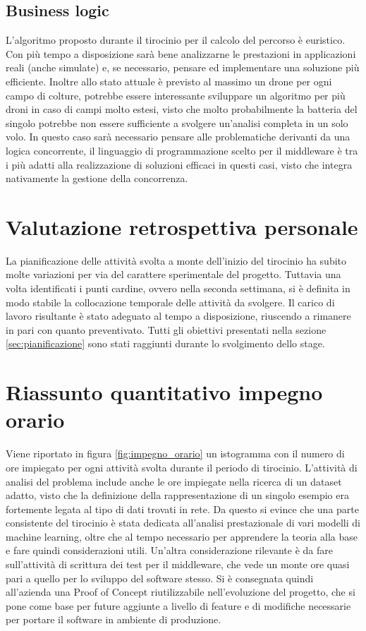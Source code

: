 \subsection{Business logic}
L'algoritmo proposto durante il tirocinio per il calcolo del percorso è euristico. Con più tempo a disposizione sarà bene analizzarne le prestazioni in applicazioni reali (anche simulate) e, se necessario, pensare ed implementare una soluzione più efficiente. Inoltre allo stato attuale è previsto al massimo un drone per ogni campo di colture, potrebbe essere interessante sviluppare un algoritmo per più droni in caso di campi molto estesi, visto che molto probabilmente la batteria del singolo potrebbe non essere sufficiente a svolgere un'analisi completa in un solo volo. In questo caso sarà necessario pensare alle problematiche derivanti da una logica concorrente, il linguaggio di programmazione scelto per il middleware è tra i più adatti alla realizzazione di soluzioni efficaci in questi casi, visto che integra nativamente la gestione della concorrenza.

\section{Valutazione retrospettiva personale}
La pianificazione delle attività svolta a monte dell'inizio del tirocinio ha subito molte variazioni per via del carattere sperimentale del progetto. Tuttavia una volta identificati i punti cardine, ovvero nella seconda settimana, si è definita in modo stabile la collocazione temporale delle attività da svolgere. Il carico di lavoro risultante è stato adeguato al tempo a disposizione, riuscendo a rimanere in pari con quanto preventivato. Tutti gli obiettivi presentati nella sezione \ref{sec:pianificazione} sono stati raggiunti durante lo svolgimento dello stage.

\section{Riassunto quantitativo impegno orario}
Viene riportato in figura \ref{fig:impegno_orario} un istogramma con il numero di ore impiegato per ogni attività svolta durante il periodo di tirocinio. L'attività di analisi del problema include anche le ore impiegate nella ricerca di un dataset adatto, visto che la definizione della rappresentazione di un singolo esempio era fortemente legata al tipo di dati trovati in rete. Da questo si evince che una parte consistente del tirocinio è stata dedicata all'analisi prestazionale di vari modelli di machine learning, oltre che al tempo necessario per apprendere la teoria alla base e fare quindi considerazioni utili.
Un'altra considerazione rilevante è da fare sull'attività di scrittura dei test per il middleware, che vede un monte ore quasi pari a quello per lo sviluppo del software stesso. Si è consegnata quindi all'azienda una Proof of Concept riutilizzabile nell'evoluzione del progetto, che si pone come base per future aggiunte a livello di feature e di modifiche necessarie per portare il software in ambiente di produzione.

